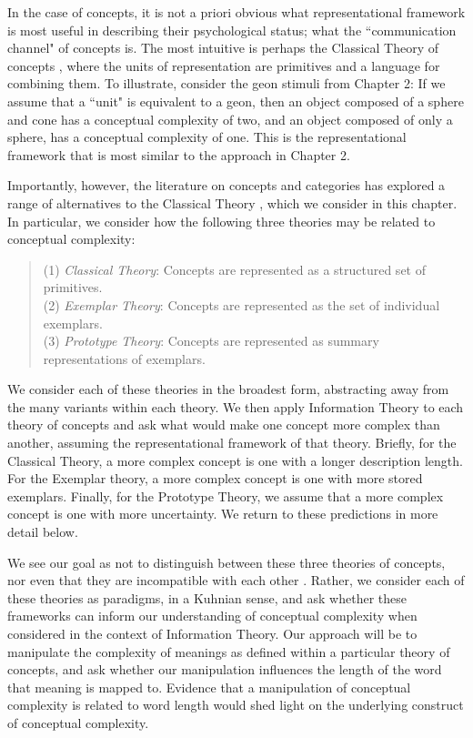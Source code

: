 In the case of concepts, it is not a priori obvious what representational framework is most useful in describing their psychological status; what the ``communication channel" of concepts is. The most intuitive is perhaps the Classical Theory of concepts \cite{laurence1999concepts}, where the units of  representation are primitives and a language for combining them. To illustrate, consider the geon stimuli from Chapter 2:  If we assume that a ``unit" is equivalent to a geon,  then an object composed of a sphere and cone has a conceptual complexity of two, and an object composed of only a sphere, has a conceptual complexity of one. This is the representational framework that is most similar to the approach in Chapter 2. 

Importantly, however, the literature on concepts and categories has explored a range of alternatives to the Classical Theory \cite{laurence1999concepts}, which we consider in this chapter. In particular,  we consider how the following three theories may be related to conceptual complexity:
\begin{quote}
	(1) {\it Classical Theory}: Concepts are represented as a structured set of primitives.\\
	(2) {\it Exemplar Theory}: Concepts are represented as the set of individual exemplars.\\
	(3) {\it Prototype Theory}: Concepts are represented as summary representations of exemplars.
\end{quote}
We consider each of these theories in the broadest form, abstracting away from the many variants within each theory. We then apply Information Theory to each theory of concepts and ask what would make one concept more complex than another, assuming the representational framework of that theory. Briefly, for the Classical Theory, a more complex concept is one with a longer description length. For the Exemplar theory, a more complex concept is one with more stored exemplars. Finally, for the Prototype Theory, we assume that a more complex concept is one with more uncertainty. We return to these predictions in more detail below.

We see our goal as not  to distinguish between these three theories of concepts, nor even that they are incompatible with each other \cite{murphy2015there,briscoe2011conceptual}. Rather, we consider each of these theories as paradigms, in a Kuhnian sense, and ask whether these frameworks can inform our understanding of conceptual complexity when considered in the context of Information Theory. Our approach will be to manipulate the complexity of meanings as defined within a particular theory of concepts, and ask whether our manipulation influences the length of the word that meaning is mapped to. Evidence that a manipulation of conceptual complexity is related to word length would shed light on the underlying construct of conceptual complexity.  

